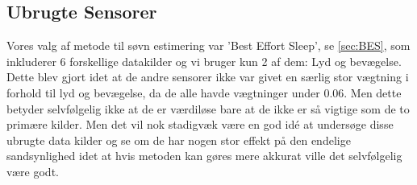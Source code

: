 \subsection{Ubrugte Sensorer}
Vores valg af metode til søvn estimering var 'Best Effort Sleep', se \cref{sec:BES}, som inkluderer 6 forskellige datakilder og vi bruger kun 2 af dem: Lyd og bevægelse. 
Dette blev gjort idet at de andre sensorer ikke var givet en særlig stor vægtning i forhold til lyd og bevægelse, da de alle havde vægtninger under 0.06. Men dette betyder selvfølgelig ikke at de er værdiløse bare at de ikke er så vigtige som de to primære kilder.
Men det vil nok stadigvæk være en god idé at undersøge disse ubrugte data kilder og se om de har nogen stor effekt på den endelige sandsynlighed idet at hvis metoden kan gøres mere akkurat ville det  selvfølgelig være godt. 
